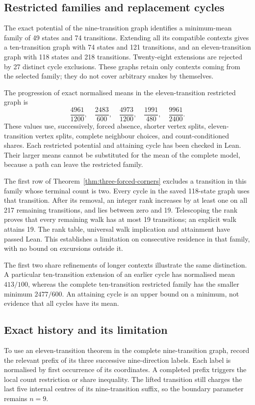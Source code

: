 \documentclass[11pt,a4paper]{article}
\theoremstyle{definition}
\theoremstyle{remark}
\begin{document}
\subsection{Restricted families and replacement cycles}\label{sec:restricted-family}
The exact potential of the nine-transition graph identifies a minimum-mean family of 49 states and 74 transitions. Extending all its compatible contexts gives a ten-transition graph with 74 states and 121 transitions, and an eleven-transition graph with 118 states and 218 transitions. Twenty-eight extensions are rejected by 27 distinct cycle exclusions. These graphs retain only contexts coming from the selected family; they do not cover arbitrary snakes by themselves.

The progression of exact normalised means in the eleven-transition restricted graph is
\[
\frac{4961}{1200},\quad\frac{2483}{600},\quad
\frac{4973}{1200},\quad\frac{1991}{480},\quad
\frac{9961}{2400}.
\]
These values use, successively, forced absence, shorter vertex splits, eleven-transition vertex splits, complete neighbour choices, and count-conditioned shares. Each restricted potential and attaining cycle has been checked in Lean. Their larger means cannot be substituted for the mean of the complete model, because a path can leave the restricted family.

The first row of Theorem~\ref{thm:three-forced-corners} excludes a transition in this family whose terminal count is two. Every cycle in the saved 118-state graph uses that transition. After its removal, an integer rank increases by at least one on all 217 remaining transitions, and lies between zero and 19. Telescoping the rank proves that every remaining walk has at most 19 transitions; an explicit walk attains 19. The rank table, universal walk implication and attainment have passed Lean. This establishes a limitation on consecutive residence in that family, with no bound on excursions outside it.

The first two share refinements of longer contexts illustrate the same distinction. A particular ten-transition extension of an earlier cycle has normalised mean $413/100$, whereas the complete ten-transition restricted family has the smaller minimum $2477/600$. An attaining cycle is an upper bound on a minimum, not evidence that all cycles have its mean.

\subsection{Exact history and its limitation}\label{sec:history-recognition}
To use an eleven-transition theorem in the complete nine-transition graph, record the relevant prefix of its three successive nine-direction labels. Each label is normalised by first occurrence of its coordinates. A completed prefix triggers the local count restriction or share inequality. The lifted transition still charges the last five internal centres of its nine-transition suffix, so the boundary parameter remains $n=9$.
\end{document}

